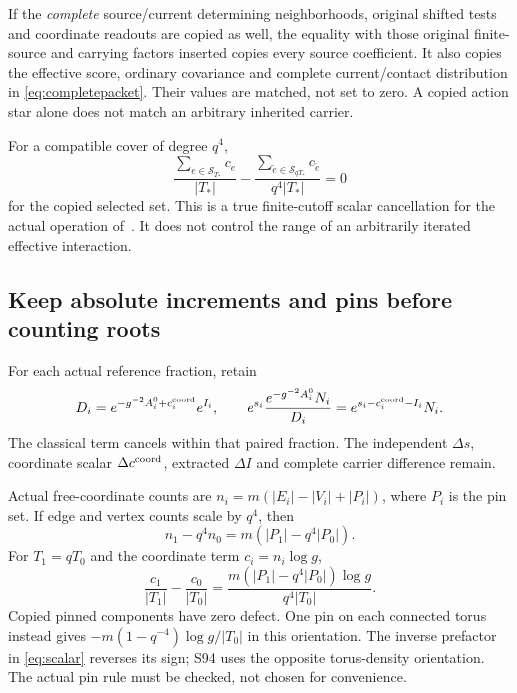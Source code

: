 \documentclass[11pt,letterpaper]{article}
\theoremstyle{remark}\newtheorem{remark}[theorem]{Remark}
\begin{document}
If the \emph{complete} source/current determining neighborhoods, original shifted tests and coordinate readouts are copied as well, the equality with those original finite-source and carrying factors inserted copies every source coefficient. It also copies the effective score, ordinary covariance and complete current/contact distribution in \eqref{eq:completepacket}. Their values are matched, not set to zero. A copied action star alone does not match an arbitrary inherited carrier.

For a compatible cover of degree $q^4$,
\begin{equation}\label{eq:rootcancel}
 \frac{\sum_{e\in\mathcal S_{T_*}}c_e}{|T_*|}
 -
 \frac{\sum_{\tilde e\in\mathcal S_{qT_*}}c_{\tilde e}}{q^4|T_*|}
 =0
\end{equation}
for the copied selected set. This is a true finite-cutoff scalar cancellation for the actual operation of~\cite[\S2]{SZ}. It does not control the range of an arbitrarily iterated effective interaction.

\subsection{Keep absolute increments and pins before counting roots}

For each actual reference fraction, retain
\begin{equation}\label{eq:scalar}
 D_i=e^{-g^{-2}A_i^0+c_i^{\rm coord}}e^{I_i},\qquad
 e^{s_i}\frac{e^{-g^{-2}A_i^0}N_i}{D_i}
 =e^{s_i-c_i^{\rm coord}-I_i}N_i.
\end{equation}
The classical term cancels within that paired fraction. The independent $\Delta s$, coordinate scalar $\Delta c^{\rm coord}$, extracted $\Delta I$ and complete carrier difference remain.

Actual free-coordinate counts are
$n_i=m(|E_i|-|V_i|+|P_i|)$, where $P_i$ is the pin set. If edge and vertex counts scale by $q^4$, then
\[
 n_1-q^4n_0=m(|P_1|-q^4|P_0|).
\]
For $T_1=qT_0$ and the coordinate term $c_i=n_i\log g$,
\begin{equation}\label{eq:pins}
 \frac{c_1}{|T_1|}-\frac{c_0}{|T_0|}
 =\frac{m(|P_1|-q^4|P_0|)\log g}{q^4|T_0|}.
\end{equation}
Copied pinned components have zero defect. One pin on each connected torus instead gives
$-m(1-q^{-4})\log g/|T_0|$ in this orientation. The inverse prefactor in \eqref{eq:scalar} reverses its sign; S94 uses the opposite torus-density orientation. The actual pin rule must be checked, not chosen for convenience.
\end{document}
